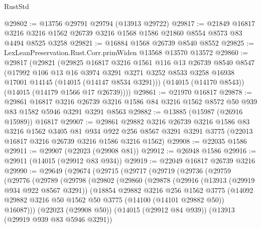\begin{lexlean}{RustStd}
\begin{coremodule}
@29802 := @13756 @29791 @29794 (@13913 @29722)
@29817 := @21849
    @16817
    @3216
    @3216
    @1562
    @26739
    @3216
    @1568
    @1586
    @21860
    @8554
    @8573
    @83
    @4494
    @8525
    @3258
@29821 := @16884 @1568 @26739 @8540 @8552
@29825 := LexLeanPreservation.Rust.Corr.primWiden @13568 @13570 @13572
@29860 := @29817
    (@29821
      (@29825
        @16817
        @3216
        @1561
        @116
        @13
        @26739
        @8540
        @8547
        (@17992
          @106
          @13
          @16
          @3974
          @3291
          @3271
          @3252
          @8533
          @3258
          @16938
          @17001
          @14145
          (@14015 (@14147 @8534 @3291)))
        (@14015 (@14170 @8543))
        (@14015 (@14179 @1566 @17 @26739))))
@29861 := @21970 @16817
@29878 := @29861
    @16817
    @3216
    @26739
    @3216
    @1586
    @84
    @3216
    @1562
    @8572
    @50
    @939
    @83
    @1582
    @5946
    @3291
    @3291
    @8563
@29882 := @13885 (@15987 (@26916 @15989)) @16817
@29907 := @29861
    @29882
    @3216
    @26739
    @3216
    @1586
    @83
    @3216
    @1562
    @3405
    @81
    @934
    @922
    @256
    @8567
    @3291
    @3291
    @3775
    (@22013 @16817 @3216 @26739 @3216 @1586 @3216 @1562)
@29908 := @22035 @1586
@29911 := @29907 (@22023 (@29908 @81))
@29912 := @26948 @1586
@29916 := @29911 (@14015 (@29912 @83 @934))
@29919 := @22049 @16817 @26739 @3216
@29990 := @29649
    (@29674
      (@29715
        (@29717
          (@29719
            (@29736
              (@29759
                (@29776
                  (@29789
                    (@29798
                      (@29802
                        (@29860
                          (@29878
                            (@29916
                              (@13913 (@29919 @934 @922 @8567 @3291))
                              (@18854
                                @29882
                                @3216
                                @256
                                @1562
                                @3775
                                (@14092
                                  @29882
                                  @3216
                                  @50
                                  @1562
                                  @50
                                  @3775
                                  (@14100 (@14101 @29882 @50))
                                  @16087)))
                            (@22023 (@29908 @50))
                            (@14015 (@29912 @84 @939))
                            (@13913 (@29919 @939 @83 @5946 @3291))

\end{coremodule}
\end{lexlean}
